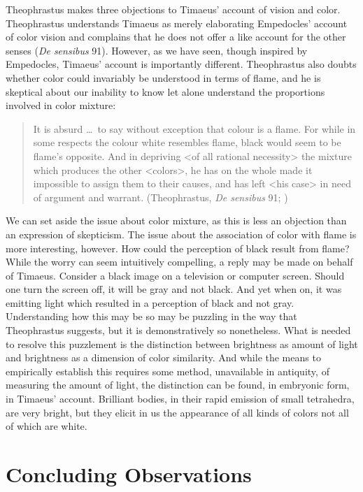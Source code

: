 Theophrastus makes three objections to Timaeus' account of vision and color. Theo\-phrastus understands Timaeus as merely elaborating Empedocles' account of color vision and complains that he does not offer a like account for the other senses (\emph{De sensibus} 91). However, as we have seen, though inspired by Empedocles, Timaeus' account is importantly different. Theophrastus also doubts whether color could invariably be understood in terms of flame, and he is skeptical about our inability to know let alone understand the proportions involved in color mixture:
\begin{quote}
	It is absurd \ldots\ to say without exception that colour is a flame. For while in some respects the colour white resembles flame, black would seem to be flame's opposite. And in depriving <of all rational necessity> the mixture which produces the other <colors>, he has on the whole made it impossible to assign them to their causes, and has left <his case> in need of argument and warrant. (Theophrastus, \emph{De sensibus} 91; \citealt[149--50]{Stratton:1917vn})
\end{quote}
We can set aside the issue about color mixture, as this is less an objection than an expression of skepticism. The issue about the association of color with flame is more interesting, however. How could the perception of black result from flame? While the worry can seem intuitively compelling, a reply may be made on behalf of Timaeus. Consider a black image on a television or computer screen. Should one turn the screen off, it will be gray and not black. And yet when on, it was emitting light which resulted in a perception of black and not gray. Understanding how this may be so may be puzzling in the way that Theophrastus suggests, but it is demonstratively so nonetheless. What is needed to resolve this puzzlement is the distinction between brightness as amount of light and brightness as a dimension of color similarity. And while the means to empirically establish this requires some method, unavailable in antiquity, of measuring the amount of light, the distinction can be found, in embryonic form, in Timaeus' account. Brilliant bodies, in their rapid emission of small tetrahedra, are very bright, but they elicit in us the appearance of all kinds of colors not all of which are white.


\section{Concluding Observations} %
\label{sec:concluding_observations_pp}

